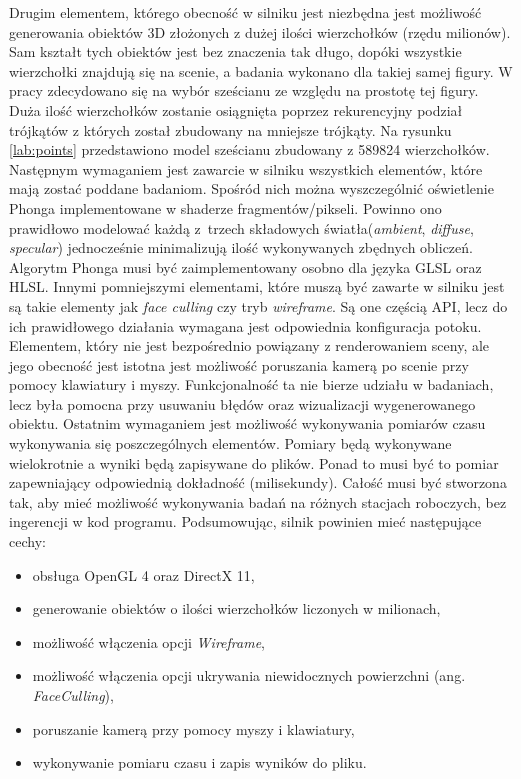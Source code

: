 \documentclass[archive]{mgr}
\begin{document}
Drugim elementem, którego obecność w silniku jest niezbędna jest możliwość generowania obiektów 3D złożonych z dużej ilości wierzchołków (rzędu milionów). Sam kształt tych obiektów jest bez znaczenia tak długo, dopóki wszystkie wierzchołki znajdują się na scenie, a badania wykonano dla takiej samej figury. W pracy zdecydowano się na wybór sześcianu ze względu na prostotę tej figury. Duża ilość wierzchołków zostanie osiągnięta poprzez rekurencyjny podział trójkątów z których został zbudowany na mniejsze trójkąty. Na rysunku \ref{lab:points} przedstawiono model sześcianu zbudowany z 589824 wierzchołków. \\



Następnym wymaganiem jest zawarcie w silniku wszystkich elementów, które mają zostać poddane badaniom. Spośród nich można wyszczególnić oświetlenie Phonga implementowane w shaderze fragmentów/pikseli. Powinno ono prawidłowo modelować każdą z~trzech składowych światła(\emph{ambient}, \emph{diffuse}, \emph{specular}) jednocześnie minimalizują ilość wykonywanych zbędnych obliczeń. Algorytm Phonga musi być zaimplementowany osobno dla języka GLSL oraz HLSL.
Innymi pomniejszymi elementami, które muszą być zawarte w silniku jest są takie elementy jak \emph{face culling} czy tryb \emph{wireframe}. Są one częścią API, lecz do ich prawidłowego działania wymagana jest odpowiednia konfiguracja potoku.\\

Elementem, który nie jest bezpośrednio powiązany z renderowaniem sceny, ale jego obecność jest istotna jest możliwość poruszania kamerą po scenie przy pomocy klawiatury i myszy. Funkcjonalność ta nie bierze udziału w badaniach, lecz była pomocna przy usuwaniu błędów oraz wizualizacji wygenerowanego obiektu.
Ostatnim wymaganiem jest możliwość wykonywania pomiarów czasu wykonywania się poszczególnych elementów. Pomiary będą wykonywane wielokrotnie a wyniki będą zapisywane do plików. Ponad to musi być to pomiar zapewniający odpowiednią dokładność (milisekundy). Całość musi być stworzona tak, aby mieć możliwość wykonywania badań na różnych stacjach roboczych, bez ingerencji w kod programu. Podsumowując, silnik powinien mieć następujące cechy:
\newpage
\begin{itemize}
  \item obsługa OpenGL 4 oraz DirectX 11,
  \item generowanie obiektów o ilości wierzchołków liczonych w milionach,
  \item możliwość włączenia opcji \emph{Wireframe},
  \item możliwość włączenia opcji ukrywania niewidocznych powierzchni (ang. \emph{FaceCulling}),
  \item poruszanie kamerą przy pomocy myszy i klawiatury,
  \item wykonywanie pomiaru czasu i zapis wyników do pliku.
\end{itemize}
\end{document}
